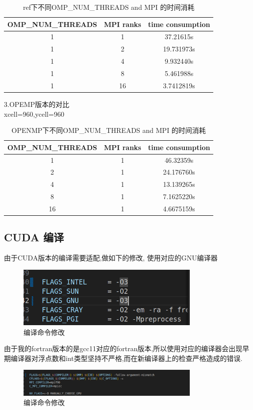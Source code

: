 \documentclass{article}
\begin{document}
\begin{CJK}{UTF8}{gbsn}
\begin{table}[H]
    \centering
    \begin{tabular}{|c|c|c|}
    \hline
    \textbf{OMP\_NUM\_THREADS} & \textbf{MPI ranks} & \textbf{time consumption} \\
    \hline
    1 & 1 &  37.21615s \\
    \hline
    1 & 2 & 19.731973s \\
    \hline
    1 & 4 & 9.932440s \\
    \hline
    1 & 8 & 5.461988s \\
    \hline
    1 & 16 & 3.7412819s \\
    \hline
    \end{tabular}
    \caption{ref下不同OMP\_NUM\_THREADS and MPI 的时间消耗}
    \label{table:combinations}
\end{table}
3.OPEMP版本的对比
\\
xcell=960,ycell=960
\begin{table}[H]
    \centering
    \begin{tabular}{|c|c|c|}
    \hline
    \textbf{OMP\_NUM\_THREADS} & \textbf{MPI ranks} & \textbf{time consumption} \\
    \hline
    1 & 1 & 46.32359s \\
    \hline
    2 & 1 & 24.176760s \\
    \hline
    4 & 1 & 13.139265s \\
    \hline
    8 & 1 & 7.1625220s \\
    \hline
    16 & 1 & 4.6675159s \\
    \hline
    \end{tabular}
    \caption{OPENMP下不同OMP\_NUM\_THREADS and MPI 的时间消耗}
    \label{table:combinations}
\end{table}
\subsection{CUDA 编译}
由于CUDA版本的编译需要适配,做如下的修改,
使用对应的GNU编译器
\begin{figure}[H]
    \centering
    \includegraphics[width=0.8\textwidth]{./compile.png}
    \caption{编译命令修改}
\end{figure}
由于我的fortran版本的是gcc11对应的fortran版本,所以使用对应的编译器会出现早期编译器对浮点数和int类型坚持不严格,而在新编译器上的检查严格造成的错误. 
\begin{figure}[H]
    \centering
    \includegraphics[width=0.8\textwidth]{./compile5.png}
    \caption{编译命令修改}
\end{figure}


\end{CJK}
\end{document}
